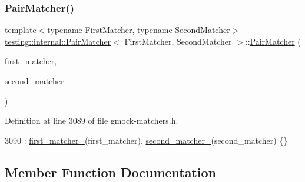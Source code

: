 \subsubsection{\texorpdfstring{Pair\+Matcher()}{PairMatcher()}}
{\footnotesize\ttfamily template$<$typename First\+Matcher, typename Second\+Matcher$>$ \\
\hyperlink{classtesting_1_1internal_1_1PairMatcher}{testing\+::internal\+::\+Pair\+Matcher}$<$ First\+Matcher, Second\+Matcher $>$\+::\hyperlink{classtesting_1_1internal_1_1PairMatcher}{Pair\+Matcher} (\begin{DoxyParamCaption}\item[{First\+Matcher}]{first\+\_\+matcher,  }\item[{Second\+Matcher}]{second\+\_\+matcher }\end{DoxyParamCaption})\hspace{0.3cm}{\ttfamily [inline]}}



Definition at line 3089 of file gmock-\/matchers.\+h.


\begin{DoxyCode}
3090       : \hyperlink{classtesting_1_1internal_1_1PairMatcher_ac3e59612dd93bddb7ce606ab4419bc26}{first\_matcher\_}(first\_matcher), \hyperlink{classtesting_1_1internal_1_1PairMatcher_a2ff03fa2ac3d715052feb21b7b61084d}{second\_matcher\_}(second\_matcher) \{\}
\end{DoxyCode}


\subsection{Member Function Documentation}
\mbox{\label{classtesting_1_1internal_1_1PairMatcher_aa1e46fafd6d017cfff8884906e567d92}} 

